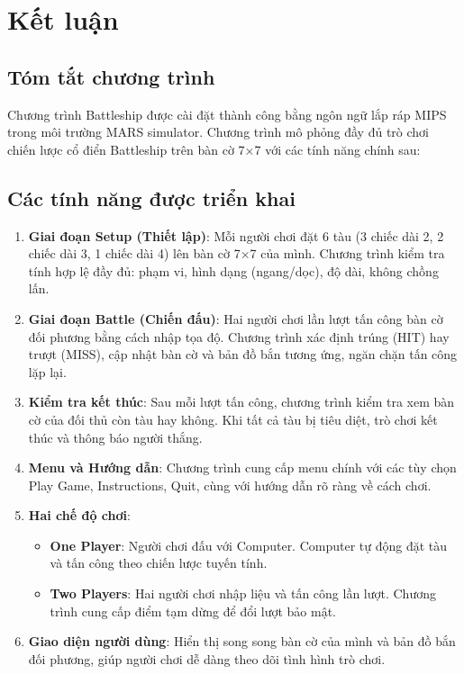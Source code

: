 
\section{Kết luận}

\subsection{Tóm tắt chương trình}

Chương trình Battleship được cài đặt thành công bằng ngôn ngữ lắp ráp MIPS trong môi trường MARS simulator. Chương trình mô phỏng đầy đủ trò chơi chiến lược cổ điển Battleship trên bàn cờ 7×7 với các tính năng chính sau:

\subsection{Các tính năng được triển khai}

\begin{enumerate}
    \item \textbf{Giai đoạn Setup (Thiết lập)}: Mỗi người chơi đặt 6 tàu (3 chiếc dài 2, 2 chiếc dài 3, 1 chiếc dài 4) lên bàn cờ 7×7 của mình. Chương trình kiểm tra tính hợp lệ đầy đủ: phạm vi, hình dạng (ngang/dọc), độ dài, không chồng lấn.
    
    \item \textbf{Giai đoạn Battle (Chiến đấu)}: Hai người chơi lần lượt tấn công bàn cờ đối phương bằng cách nhập tọa độ. Chương trình xác định trúng (HIT) hay trượt (MISS), cập nhật bàn cờ và bản đồ bắn tương ứng, ngăn chặn tấn công lặp lại.
    
    \item \textbf{Kiểm tra kết thúc}: Sau mỗi lượt tấn công, chương trình kiểm tra xem bàn cờ của đối thủ còn tàu hay không. Khi tất cả tàu bị tiêu diệt, trò chơi kết thúc và thông báo người thắng.
    
    \item \textbf{Menu và Hướng dẫn}: Chương trình cung cấp menu chính với các tùy chọn Play Game, Instructions, Quit, cùng với hướng dẫn rõ ràng về cách chơi.
    
    \item \textbf{Hai chế độ chơi}:
    \begin{itemize}
        \item \textbf{One Player}: Người chơi đấu với Computer. Computer tự động đặt tàu và tấn công theo chiến lược tuyến tính.
        \item \textbf{Two Players}: Hai người chơi nhập liệu và tấn công lần lượt. Chương trình cung cấp điểm tạm dừng để đổi lượt bảo mật.
    \end{itemize}
    
    \item \textbf{Giao diện người dùng}: Hiển thị song song bàn cờ của mình và bản đồ bắn đối phương, giúp người chơi dễ dàng theo dõi tình hình trò chơi.
\end{enumerate}

